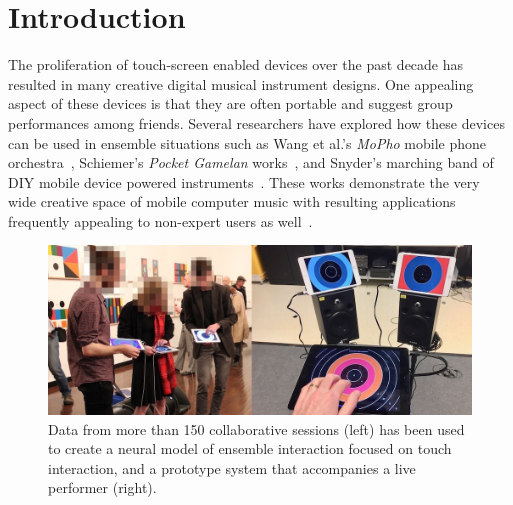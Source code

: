 \documentclass[sigchi]{acmart} %
\begin{document}


\maketitle

\section{Introduction}

The proliferation of touch-screen enabled devices over the past decade
has resulted in many creative digital musical instrument designs. One
appealing aspect of these devices is that they are often portable and
suggest group performances among friends. Several researchers have
explored how these devices can be used in ensemble situations such as
Wang et al.'s \emph{MoPho} mobile phone orchestra~\cite{Wang:2014cs},
Schiemer's \emph{Pocket Gamelan} works~\cite{Greg-Schiemer:2007mz},
and Snyder's marching band of DIY mobile device powered
instruments~\cite{Snyder:2014dp}. These works demonstrate the very
wide creative space of mobile computer music with resulting
applications frequently appealing to non-expert users as
well~\cite{Wang:2014ul, Hamilton:2011aa}.

\begin{figure}
  \includegraphics[width=\columnwidth]{neural-mode-ensemble}
  \caption{Data from more than 150 collaborative sessions (left) has
    been used to create a neural model of ensemble interaction
    focused on touch interaction, and a prototype system that
    accompanies a live performer
    (right).}\label{fig:performance-and-system}
\end{figure}
\end{document}
